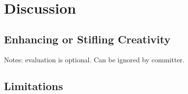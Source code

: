 \documentclass[final,authoryear,5p,times,twocolumn]{elsarticle}
\begin{document}







\section{Discussion}

\subsection{Enhancing or Stifling Creativity}

Notes: evaluation is optional. Can be ignored by committer.

\subsection{Limitations}
\end{document}
